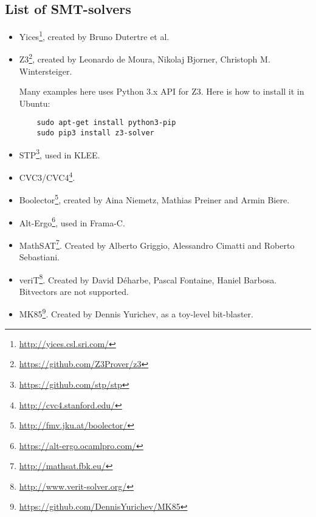 \subsection{List of SMT-solvers}

\begin{itemize}

\item Yices\footnote{\url{http://yices.csl.sri.com/}}, created by Bruno Dutertre et al.

\item Z3\footnote{\url{https://github.com/Z3Prover/z3}},
created by Leonardo de Moura, Nikolaj Bjorner, Christoph M. Wintersteiger.

	Many examples here uses Python 3.x API for Z3.
	Here is how to install it in Ubuntu:

	\begin{lstlisting}
	sudo apt-get install python3-pip
	sudo pip3 install z3-solver
	\end{lstlisting}

\item STP\footnote{\url{https://github.com/stp/stp}}, used in KLEE.

\item CVC3/CVC4\footnote{\url{http://cvc4.stanford.edu/}}.

\item Boolector\footnote{\url{http://fmv.jku.at/boolector/}}, created by Aina Niemetz, Mathias Preiner and Armin Biere.

\item Alt-Ergo\footnote{\url{https://alt-ergo.ocamlpro.com/}}, used in Frama-C.

\item MathSAT\footnote{\url{http://mathsat.fbk.eu/}}. Created by Alberto Griggio, Alessandro Cimatti and Roberto Sebastiani.

\item veriT\footnote{\url{http://www.verit-solver.org/}}.
Created by David Déharbe, Pascal Fontaine, Haniel Barbosa.
Bitvectors are not supported.

\item MK85\footnote{\url{https://github.com/DennisYurichev/MK85}}. Created by Dennis Yurichev, as a toy-level bit-blaster.

\end{itemize}

